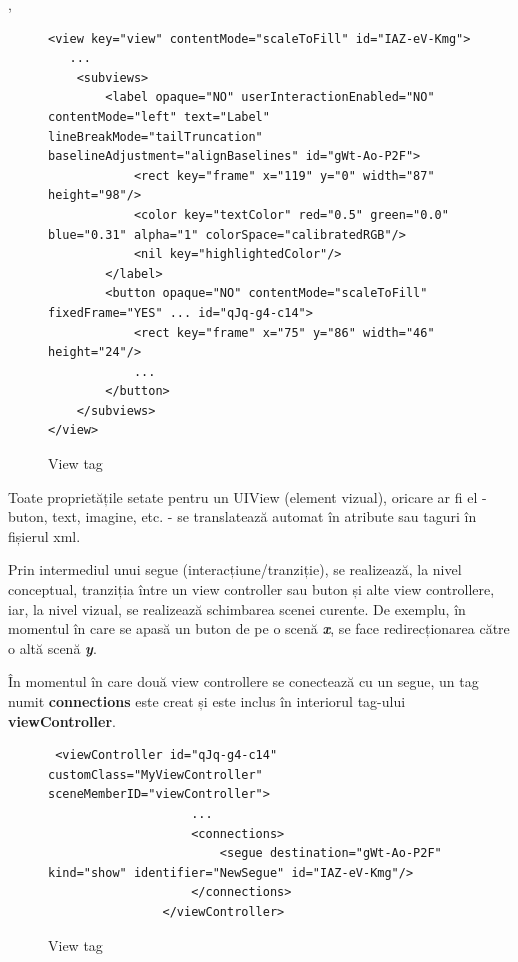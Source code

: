  , 


\begin{figure}[!htbp]
\lstset{language=XML}
\begin{lstlisting}
<view key="view" contentMode="scaleToFill" id="IAZ-eV-Kmg">
   ...
    <subviews>
        <label opaque="NO" userInteractionEnabled="NO" contentMode="left" text="Label" lineBreakMode="tailTruncation" baselineAdjustment="alignBaselines" id="gWt-Ao-P2F">
            <rect key="frame" x="119" y="0" width="87" height="98"/>
            <color key="textColor" red="0.5" green="0.0" blue="0.31" alpha="1" colorSpace="calibratedRGB"/>
            <nil key="highlightedColor"/>
        </label>
        <button opaque="NO" contentMode="scaleToFill" fixedFrame="YES" ... id="qJq-g4-c14">
            <rect key="frame" x="75" y="86" width="46" height="24"/>
            ...
        </button>
    </subviews>
</view>
\end{lstlisting}
\caption{View tag}\label{fig:view}
\end{figure}

Toate proprietățile setate pentru un UIView (element vizual), oricare ar fi el - buton, text, imagine, etc. - se translatează automat în atribute sau taguri în fișierul xml.

Prin intermediul unui segue (interacțiune/tranziție), se realizează, la nivel conceptual, tranziția între un view controller sau buton și alte view controllere, iar, la nivel vizual, se realizează schimbarea scenei curente. De exemplu, în momentul în care se apasă un buton de pe o scenă \textbf{\textit{x}}, se face redirecționarea către o altă scenă \textbf{\textit{y}}. 

În momentul în care două view controllere se conectează cu un segue, un tag numit \textbf{connections} este creat și este inclus în interiorul tag-ului \textbf{viewController}.

\begin{figure}[!htbp]
\lstset{language=XML}\label{segueXML}
\begin{lstlisting}
 <viewController id="qJq-g4-c14" customClass="MyViewController" sceneMemberID="viewController">
                    ...
                    <connections>
                        <segue destination="gWt-Ao-P2F" kind="show" identifier="NewSegue" id="IAZ-eV-Kmg"/>
                    </connections>
                </viewController>
\end{lstlisting}
\caption{View tag}\label{fig:view}
\end{figure}

